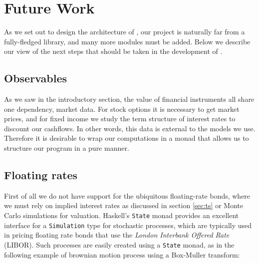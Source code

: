 \chapter{Future Work}

As we set out to design the architecture of \hql, our project is naturally far 
from a fully-fledged library, and many more modules must be added. Below we
describe our view of the next steps that should be taken in the development
of \hql.

\section{Observables}

As we saw in the introductory section, the value of financial instruments
all share one dependency, market data. For stock options it is necessary 
to get market prices, and for fixed income we study the term structure of
interest rates to discount our cashflows. In other words, this data is 
external to the models we use.\\

Therefore it is desirable to wrap our computations in a monad that allows us
to structure our program in a pure manner.


\section{Floating rates}

First of all we do not have support for the ubiquitous floating-rate bonds, 
where we must rely on implied interest rates as discussed in section \ref{sec:ts}
or Monte Carlo simulations for valuation. Haskell's 
\texttt{State} monad provides an excellent interface for a \texttt{Simulation}
type for stochastic processes, which are typically used in pricing floating
rate bonds that use the \emph{London Interbank Offered Rate} (LIBOR). Such
processes are easily created using a \texttt{State} monad, as in the following
example of brownian motion process  using a  Box-Muller transform:



